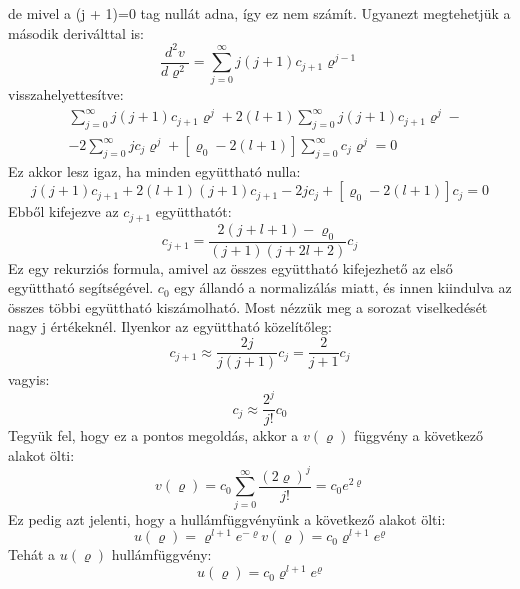 \documentclass[a4paper,12pt]{article}
\begin{document}
de mivel a (j + 1)=0 tag nullát adna, így ez nem számít. Ugyanezt megtehetjük a második deriválttal is:
\begin{equation}
    \frac{d^2 v}{d \varrho^2} = \sum_{j=0}^{\infty} j (j + 1) c_{j + 1} \varrho^{j - 1}
\end{equation}
visszahelyettesítve:
\begin{equation}
    \begin{aligned}
        & \sum_{j=0}^{\infty} j(j+1)c_{j+1} \varrho^{j} + 2(l + 1) \sum_{j=0}^{\infty} j(j + 1) c_{j + 1} \varrho^{j} - \\
        & - 2 \sum_{j=0}^{\infty} j c_j \varrho^{j} + [\varrho_0 - 2(l + 1)] \sum_{j=0}^{\infty} c_j \varrho^j = 0
    \end{aligned}
\end{equation}
Ez akkor lesz igaz, ha minden együttható nulla:
\begin{equation}
    j(j + 1) c_{j + 1} + 2(l + 1) (j + 1) c_{j + 1} - 2 j c_j + [\varrho_0 - 2(l + 1)] c_j = 0
\end{equation}
Ebből kifejezve az $c_{j + 1}$ együtthatót:
\begin{equation}
    c_{j + 1} = \frac{2(j + l + 1) - \varrho_0}{(j + 1)(j + 2l + 2)} c_j
\end{equation}
Ez egy rekurziós formula, amivel az összes együttható kifejezhető az első együttható segítségével. $c_0$ egy állandó a normalizálás miatt, 
és innen kiindulva az összes többi együttható kiszámolható. Most nézzük meg a sorozat viselkedését nagy j értékeknél. Ilyenkor az együttható közelítőleg:
\begin{equation}
    c_{j + 1} \approx \frac{2j}{j(j+1)}c_j = \frac{2}{j + 1} c_j
\end{equation}
vagyis:
\begin{equation}
    c_j \approx \frac{2^j}{j!} c_0
\end{equation}
Tegyük fel, hogy ez a pontos megoldás, akkor a $v(\varrho)$ függvény a következő alakot ölti:
\begin{equation}
    v(\varrho) = c_0 \sum_{j=0}^{\infty} \frac{(2 \varrho)^j}{j!} = c_0 e^{2 \varrho}
\end{equation}
Ez pedig azt jelenti, hogy a hullámfüggvényünk a következő alakot ölti:
\begin{equation}
    u(\varrho) = \varrho^{l + 1} e^{-\varrho} v(\varrho) = c_0 \varrho^{l + 1} e^{\varrho}
\end{equation}
Tehát a $u(\varrho)$ hullámfüggvény:
\begin{equation}
    u(\varrho) = c_0 \varrho^{l + 1} e^{\varrho}
\end{equation}
\end{document}
